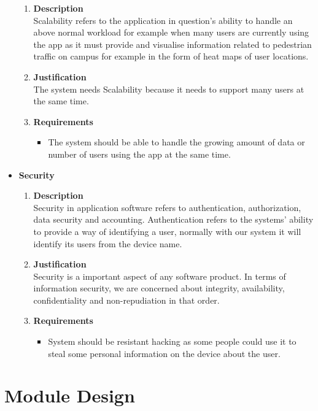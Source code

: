 \documentclass{article}
\begin{document}
\begin{itemize}
			\begin{enumerate}
				\item \textbf{Description} \\
				Scalability refers to the application in question's ability to handle an above normal workload for example when many users are currently using the app as it must provide and visualise information related to pedestrian traffic on campus for example in the form of heat maps of user locations.
				\item \textbf{Justification} \\
				The system needs Scalability because it needs to support many users at the same time.
				\item \textbf{Requirements}
				\begin{itemize}
					\item The system should be able to handle the growing amount of data or number of users using the app at the same time.
				\end{itemize}
			\end{enumerate}
		\item \textbf {Security}
		\begin{enumerate}
			\item \textbf{Description} \\
			Security in application software refers to authentication, authorization, data security and accounting. Authentication refers to the systems' ability to provide a way of identifying a user, normally with our system it will identify its users from the device name.
			\item \textbf{Justification} \\
			Security is a important aspect of any software product. In terms of information security, we are concerned about integrity, availability, confidentiality and non-repudiation in that order. 

			\item \textbf{Requirements}
			\begin{itemize}
				\item System should be resistant hacking as some people could use it to steal some personal information on the device about the user.
			\end{itemize}
		\end{enumerate}
	\end{itemize}
	
	\pagebreak
	
	\section{Module Design}
	
\end{document}
